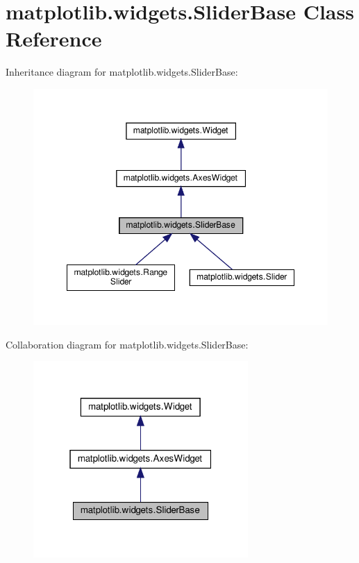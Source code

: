 \hypertarget{classmatplotlib_1_1widgets_1_1SliderBase}{}\section{matplotlib.\+widgets.\+Slider\+Base Class Reference}
\label{classmatplotlib_1_1widgets_1_1SliderBase}


Inheritance diagram for matplotlib.\+widgets.\+Slider\+Base\+:
\nopagebreak
\begin{figure}[H]
\begin{center}
\leavevmode
\includegraphics[width=348pt]{classmatplotlib_1_1widgets_1_1SliderBase__inherit__graph}
\end{center}
\end{figure}


Collaboration diagram for matplotlib.\+widgets.\+Slider\+Base\+:
\nopagebreak
\begin{figure}[H]
\begin{center}
\leavevmode
\includegraphics[width=232pt]{classmatplotlib_1_1widgets_1_1SliderBase__coll__graph}
\end{center}
\end{figure}
